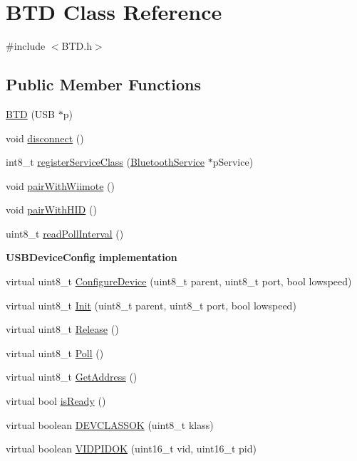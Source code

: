 \hypertarget{class_b_t_d}{\section{\-B\-T\-D \-Class \-Reference}
\label{class_b_t_d}
}


{\ttfamily \#include $<$\-B\-T\-D.\-h$>$}

\subsection*{\-Public \-Member \-Functions}
\begin{DoxyCompactItemize}
\item 
\hyperlink{class_b_t_d_a5f07597fe15a2b917cce405fe87f2981}{\-B\-T\-D} (\-U\-S\-B $\ast$p)
\item 
void \hyperlink{class_b_t_d_a610183f9ddf04155ef2612d1839af7da}{disconnect} ()
\item 
int8\-\_\-t \hyperlink{class_b_t_d_a4adfc7e51ad3b3c03e7c37d1af159e73}{register\-Service\-Class} (\hyperlink{class_bluetooth_service}{\-Bluetooth\-Service} $\ast$p\-Service)
\item 
void \hyperlink{class_b_t_d_a6b66a27c0fd359e3129f53451352b55c}{pair\-With\-Wiimote} ()
\item 
void \hyperlink{class_b_t_d_a0b59db80825ffd5974e0d2c4a046b328}{pair\-With\-H\-I\-D} ()
\item 
uint8\-\_\-t \hyperlink{class_b_t_d_a2a9ecb996243e070e70972370e45e4fd}{read\-Poll\-Interval} ()
\end{DoxyCompactItemize}
\begin{Indent}{\bf \-U\-S\-B\-Device\-Config implementation}\par
\begin{DoxyCompactItemize}
\item 
virtual uint8\-\_\-t \hyperlink{class_b_t_d_a4f1808a49e9aca397ba829fac16dc5c3}{\-Configure\-Device} (uint8\-\_\-t parent, uint8\-\_\-t port, bool lowspeed)
\item 
virtual uint8\-\_\-t \hyperlink{class_b_t_d_a48608619d8253972dd132edbb3001c5f}{\-Init} (uint8\-\_\-t parent, uint8\-\_\-t port, bool lowspeed)
\item 
virtual uint8\-\_\-t \hyperlink{class_b_t_d_aa87c23bce56a20f2db47c6a40c8eda87}{\-Release} ()
\item 
virtual uint8\-\_\-t \hyperlink{class_b_t_d_a76e201c5b561e3a6d0405894ba5c2e41}{\-Poll} ()
\item 
virtual uint8\-\_\-t \hyperlink{class_b_t_d_aecdd9d00fc9c12bb3677ed213a6687c3}{\-Get\-Address} ()
\item 
virtual bool \hyperlink{class_b_t_d_a1b2440748bdaaeb552a05b0f0902f5d8}{is\-Ready} ()
\item 
virtual boolean \hyperlink{class_b_t_d_a8760371377c1ba08292b6cc71824754e}{\-D\-E\-V\-C\-L\-A\-S\-S\-O\-K} (uint8\-\_\-t klass)
\item 
virtual boolean \hyperlink{class_b_t_d_adf5dce0907ea33c919908fea5dc0cf21}{\-V\-I\-D\-P\-I\-D\-O\-K} (uint16\-\_\-t vid, uint16\-\_\-t pid)
\end{DoxyCompactItemize}
\end{Indent}
